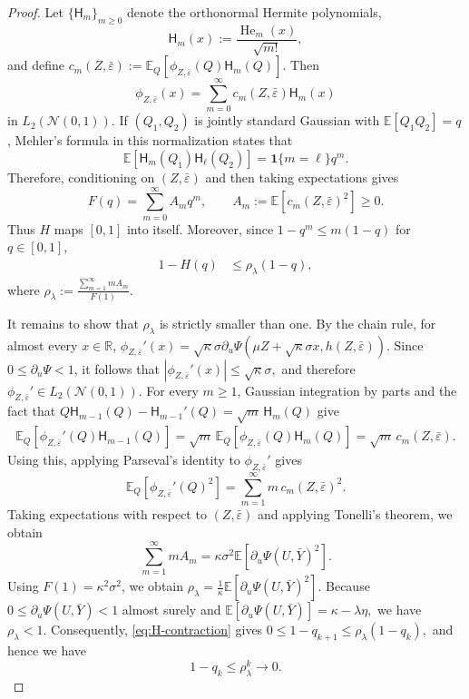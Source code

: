\documentclass[12pt,reqno]{amsart}
\begin{document}
{\begin{proof}
Let $\{\mathsf H_m\}_{m\ge0}$ denote the orthonormal Hermite polynomials,
\[
\mathsf H_m(x)
:=
\frac{\operatorname{He}_m(x)}{\sqrt{m!}},
\]
and define $c_m(Z,\bar\varepsilon):=\mathbb E_Q
\left[\phi_{Z,\bar\varepsilon}(Q)\mathsf H_m(Q)\right].$
Then
\[
\phi_{Z,\bar\varepsilon}(x)
=
\sum_{m=0}^{\infty}
c_m(Z,\bar\varepsilon)\mathsf H_m(x)
\]
in $L_2(\mathcal N(0,1))$.
If $(Q_1,Q_2)$ is jointly standard Gaussian with
$\mathbb E[Q_1Q_2]=q$, Mehler's formula in this normalization states that
\[
\mathbb E
\left[
\mathsf H_m(Q_1)\mathsf H_\ell(Q_2)
\right]
=
\bm 1\{m=\ell\}q^m.
\]
Therefore, conditioning on $(Z,\bar\varepsilon)$ and then taking
expectations gives
\[
F(q)
=
\sum_{m=0}^{\infty}A_mq^m,
\qquad
A_m
:=
\mathbb E[c_m(Z,\bar\varepsilon)^2]
\ge0.
\]
Thus $H$ maps $[0,1]$ into itself. Moreover, since
$1-q^m\le m(1-q)$ for $q\in[0,1]$,
\begin{align}
1-H(q)
&\le
\rho_\lambda(1-q),
\label{eq:H-contraction}
\end{align}
where
$
\rho_\lambda
:=
\frac{\sum_{m=1}^{\infty}mA_m}{F(1)}.
$

It remains to show that $\rho_\lambda$ is strictly smaller than one.
By the chain rule, for almost every $x\in\mathbb R$,
$\phi_{Z,\bar\varepsilon}'(x)
=\sqrt{\kappa}\sigma\partial_u\Psi
\left(\mu Z+\sqrt{\kappa}\sigma x,h(Z,\bar\varepsilon)\right).$
Since $0\le\partial_u\Psi<1$, it follows that $\left|
\phi_{Z,\bar\varepsilon}'(x)
\right|
\le
\sqrt{\kappa}\sigma,$
and therefore
$\phi_{Z,\bar\varepsilon}'\in L_2(\mathcal N(0,1))$.
For every $m\ge1$, Gaussian integration by parts and the fact that $Q\mathsf H_{m-1}(Q)-\mathsf H_{m-1}'(Q)=\sqrt m\,\mathsf H_m(Q)$ give
\begin{align}
\mathbb E_Q
\left[
\phi_{Z,\bar\varepsilon}'(Q)
\mathsf H_{m-1}(Q)
\right]
=
\sqrt m\,
\mathbb E_Q
\left[
\phi_{Z,\bar\varepsilon}(Q)
\mathsf H_m(Q)
\right]
=
\sqrt m\,c_m(Z,\bar\varepsilon).
\label{eq:Hermite-derivative-coefficient}
\end{align}
Using this, applying Parseval's identity to
$\phi_{Z,\bar\varepsilon}'$ gives
\[
\mathbb E_Q
\left[
\phi_{Z,\bar\varepsilon}'(Q)^2
\right]
=
\sum_{m=1}^{\infty}
m\,c_m(Z,\bar\varepsilon)^2.
\]
Taking expectations with respect to $(Z,\bar\varepsilon)$ and applying
Tonelli's theorem, we obtain
\[
\sum_{m=1}^{\infty}mA_m
=
\kappa\sigma^2
\mathbb E
\left[
\partial_u\Psi(U,\bar Y)^2
\right].
\]
Using $F(1)=\kappa^2\sigma^2$, we obtain
$
\rho_\lambda
=
\frac1\kappa
\mathbb E[
\partial_u\Psi(U,\bar Y)^2
].
$
Because $0\le\partial_u\Psi(U,\bar Y)<1$ almost surely and
$
\mathbb E[\partial_u\Psi(U,\bar Y)]
=
\kappa-\lambda\eta,
$
we have $\rho_\lambda<1.$
Consequently, \eqref{eq:H-contraction} gives
$
0\le1-q_{k+1}
\le
\rho_\lambda(1-q_k),
$
and hence we have
\[
1-q_k\le\rho_\lambda^k\to0.
\]


\end{proof}}
\end{document}
